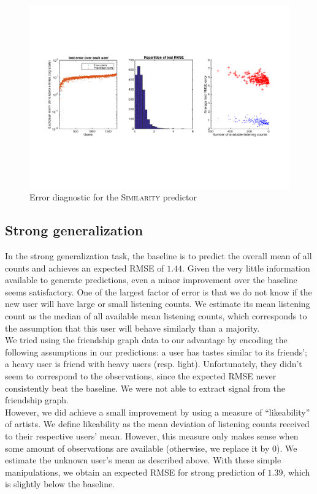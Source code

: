 \documentclass[10pt,a4paper]{article}
\begin{document}
    \begin{figure}[ht]
      \center
        \includegraphics[width=14cm]{figures/recommendation/similarity-predictor-plots.pdf}
      \caption{Error diagnostic for the \textsc{Similarity} predictor}
      \label{fig:similarity-predictor-plots}
    \end{figure}


  \subsection{Strong generalization}
  In the strong generalization task, the baseline is to predict the overall mean of all counts and achieves an expected RMSE of $1.44$. Given the very little information available to generate predictions, even a minor improvement over the baseline seems satisfactory. One of the largest factor of error is that we do not know if the new user will have large or small listening counts. We estimate its mean listening count as the median of all available mean listening counts, which corresponds to the assumption that this user will behave similarly than a majority.\\
  We tried using the friendship graph data to our advantage by encoding the following assumptions in our predictions: a user has tastes similar to its friends'; a heavy user is friend with heavy users (resp. light). Unfortunately, they didn't seem to correspond to the observations, since the expected RMSE never consistently beat the baseline. We were not able to extract signal from the friendship graph.\\
  However, we did achieve a small improvement by using a measure of ``likeability'' of artists. We define likeability as the mean deviation of listening counts received to their respective users' mean. However, this measure only makes sense when some amount of observations are available (otherwise, we replace it by $0$). We estimate the unknown user's mean as described above. With these simple manipulations, we obtain an expected RMSE for strong prediction of $1.39$, which is slightly below the baseline.
\end{document}
